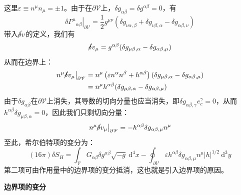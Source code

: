 \documentclass[hyperref, UTF8, a4paper]{ctexart}
\begin{document}
这里$\varepsilon \equiv n^{\mu } n_{\mu } =\pm 1$。由于在$\partial \mathscr{V}$上，$\delta g_{\alpha \beta } =\delta g^{\alpha \beta } =0$，有
\begin{equation*}
	\left. \delta \Gamma ^{\mu }{}_{\alpha \beta }\right| _{\partial \mathscr{V}} =\frac{1}{2} g^{\mu \nu }( \delta g_{\nu \alpha ,\beta } +\delta g_{\nu \beta ,\alpha } -\delta g_{\alpha \beta ,\nu })
\end{equation*}
带入$\cancel{\delta } v$的定义，我们有
\begin{equation*}
	\cancel{\delta } v_{\mu } =g^{\alpha \beta }( \delta g_{\mu \beta ,\alpha } -\delta g_{\alpha \beta ,\mu })
\end{equation*}
从而在边界上：
\begin{equation*}
	\begin{aligned}
		\left. n^{\mu }\cancel{\delta } v_{\mu }\right| _{\partial \mathscr{V}} & =n^{\mu }\left( \varepsilon n^{\alpha } n^{\beta } +h^{\alpha \beta }\right)( \delta g_{\mu \beta ,\alpha } -\delta g_{\alpha \beta ,\mu })\\
		& =n^{\mu } h^{\alpha \beta }( \delta g_{\mu \beta ,\alpha } -\delta g_{\alpha \beta ,\mu })
	\end{aligned}
\end{equation*}
由于$\delta g_{\alpha \beta }$在$\partial \mathscr{V}$上消失，其导数的切向分量也应当消失，即$\delta g_{\alpha \beta ,\gamma } e_{c}^{\gamma } =0$，从而$h^{\alpha \beta } \delta g_{\mu \beta ,\alpha } =0$，因此我们只剩切向分量：
\begin{equation*}
	\left. n^{\mu }\cancel{\delta } v_{\mu }\right| _{\partial \mathscr{V}} =-h^{\alpha \beta } \delta g_{\alpha \beta ,\mu } n^{\mu }
\end{equation*}
至此，希尔伯特项的变分为：
\begin{equation*}
	(16\pi )\delta S_{H} =\int _{\mathscr{V}} G_{\alpha \beta } \delta g^{\alpha \beta }\sqrt{-g} \ \mathrm{d}^{4} x-\oint _{\mathscr{\ \partial V}} \varepsilon h^{\alpha \beta } \delta g_{\alpha \beta ,\mu } n^{\mu } |h|^{1/2} \ \mathrm{d}^{3} y
\end{equation*}
第二项可由作用量中的边界项的变分抵消，这也就是引入边界项的原因。



\textbf{边界项的变分}
\end{document}
